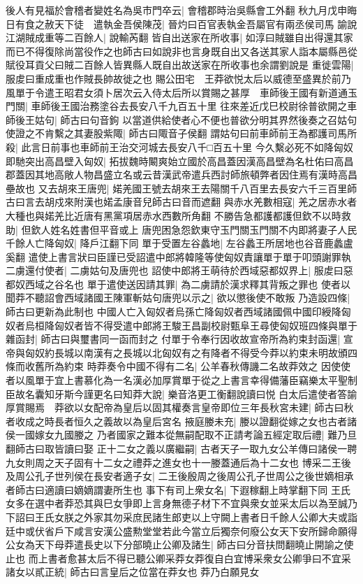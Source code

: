 後人有見福於會稽者變姓名為吳市門卒云|{
	會稽郡時治吳縣會工外翻}
秋九月戊申晦日有食之赦天下徒　遣執金吾侯陳茂|{
	晉灼曰百官表執金吾屬官有兩丞侯司馬}
諭說江湖賊成重等二百餘人|{
	說輸芮翻}
皆自出送家在所收事|{
	如淳曰賊雖自出得還其家而已不得復除尚當役作之也師古曰如說非也言身既自出又各送其家人詣本屬縣邑從賦役耳貢父曰賊二百餘人皆異縣人既自出故送家在所收事也余謂劉說是}
重徙雲陽|{
	服䖍曰重成重也作賊長帥故徙之也}
賜公田宅　王莽欲悦太后以威德至盛異於前乃風單于令遣王昭君女須卜居次云入侍太后所以賞賜之甚厚　車師後王國有新道通玉門關|{
	車師後王國治務塗谷去長安八千九百五十里}
往來差近戊巳校尉徐普欲開之車師後王姑句|{
	師古曰句音鉤}
以當道供給使者心不便也普欲分明其界然後奏之召姑句使證之不肯繫之其妻股紫陬|{
	師古曰陬音子侯翻}
謂姑句曰前車師前王為都護司馬所殺|{
	此言日前事也車師前王治交河城去長安八千□百五十里}
今久繫必死不如降匈奴即馳突出高昌壁入匈奴|{
	拓拔魏時闞爽始立國於高昌蓋因漢高昌壁為名杜佑曰高昌郡蓋因其地高敞人物昌盛立名或云昔漢武帝遣兵西討師旅頓弊者因住焉有漢時高昌壘故也}
又去胡來王唐兜|{
	婼羌國王號去胡來王去陽關千八百里去長安六千三百里師古曰言去胡戍來附漢也婼孟康音兒師古曰音而遮翻}
與赤水羌數相寇|{
	羌之居赤水者大種也與婼羌比近唐有黑黨項居赤水西數所角翻}
不勝告急都護都護但欽不以時救助|{
	但欽人姓名姓書但平音或上}
唐兜困急怨欽東守玉門關玉門關不内即將妻子人民千餘人亡降匈奴|{
	降戶江翻下同}
單于受置左谷蠡地|{
	左谷蠡王所居地也谷音鹿蠡盧奚翻}
遣使上書言狀曰臣謹已受詔遣中郎將韓隆等使匈奴責讓單于單于叩頭謝罪執二虜還付使者|{
	二虜姑句及唐兜也}
詔使中郎將王萌待於西域惡都奴界上|{
	服䖍曰惡都奴西域之谷名也}
單于遣使送因請其罪|{
	為二虜請於漢求釋其背叛之罪也}
使者以聞莽不聽詔會西域諸國王陳軍斬姑句唐兜以示之|{
	欲以懲後使不敢叛}
乃造設四條|{
	師古曰更新為此制也}
中國人亡入匈奴者烏孫亡降匈奴者西域諸國佩中國印綬降匈奴者烏桓降匈奴者皆不得受遣中郎將王駿王昌副校尉甄阜王尋使匈奴班四條與單于雜函封|{
	師古曰與璽書同一函而封之}
付單于令奉行因收故宣帝所為約束封函還|{
	宣帝與匈奴約長城以南漢有之長城以北匈奴有之有降者不得受今莽以約束未明故頒四條而收舊所為約束}
時莽奏令中國不得有二名|{
	公羊春秋傳譏二名故莽效之}
因使使者以風單于宜上書慕化為一名漢必加厚賞單于從之上書言幸得備藩臣竊樂太平聖制臣故名囊知牙斯今謹更名曰知莽大說|{
	樂音洛更工衡翻說讀曰悦}
白太后遣使者答諭厚賞賜焉　莽欲以女配帝為皇后以固其權奏言皇帝即位三年長秋宮未建|{
	師古曰秋者收成之時長者恒久之義故以為皇后宮名}
掖庭媵未充|{
	媵以證翻從嫁之女也古者諸侯一國嫁女九國媵之}
乃者國家之難本從無嗣配取不正請考論五經定取后禮|{
	難乃旦翻師古曰取皆讀曰娶}
正十二女之義以廣繼嗣|{
	古者天子一取九女公羊傳曰諸侯一聘九女則周之天子固有十二女之禮莽之進女也十一媵蓋通后為十二女也}
博采二王後及周公孔子世列侯在長安者適子女|{
	二王後殷周之後周公孔子世周公之後世嫡相承者師古曰適讀曰嫡嫡謂妻所生也}
事下有司上衆女名|{
	下遐稼翻上時掌翻下同}
王氏女多在選中者莽恐其與巳女爭即上言身無德子材下不宜與衆女並采太后以為至誠乃下詔曰王氏女朕之外家其勿采庶民諸生郎吏以上守闕上書者日千餘人公卿大夫或詣廷中或伏省戶下咸言安漢公盛勲堂堂若此今當立后獨奈何廢公女天下安所歸命願得公女為天下母莽遣長史以下分部曉止公卿及諸生|{
	師古曰分音扶問翻曉止開諭之使止也}
而上書者愈甚太后不得已聽公卿采莽女莽復自白宜博采衆女公卿爭曰不宜采諸女以貳正統|{
	師古曰言皇后之位當在莽女也}
莽乃白願見女


